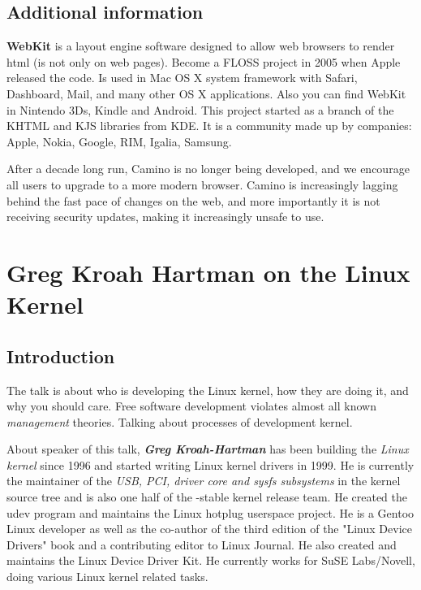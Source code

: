 \documentclass[11pt]{article}
\begin{document}
\subsection{Additional information}

\textbf{WebKit} is a layout engine software designed to allow web browsers to render html (is not only on web pages). Become a FLOSS project in 2005 when Apple released the code. Is used in Mac OS X system framework with Safari, Dashboard, Mail, and many other OS X applications. Also you can find WebKit in Nintendo 3Ds, Kindle and Android. This project started as a branch of the KHTML and KJS libraries from KDE. It is a community made up by companies: Apple, Nokia, Google, RIM, Igalia, Samsung.

After a decade long run, Camino is no longer being developed, and we encourage all users to upgrade to a more modern browser. Camino is increasingly lagging behind the fast pace of changes on the web, and more importantly it is not receiving security updates, making it increasingly unsafe to use.

\newpage


\section{Greg Kroah Hartman on the Linux Kernel}

\subsection{Introduction}
The talk is about who is developing the Linux kernel, how they are doing it, and why you should care. Free software development violates almost all known \emph{management} theories. Talking about processes of development kernel.

About speaker of this talk, \textbf{\emph{Greg Kroah-Hartman}} has been building the \emph{Linux kernel} since 1996 and started writing Linux kernel drivers in 1999. He is currently the maintainer of the \emph{USB, PCI, driver core and sysfs subsystems} in the kernel source tree and is also one half of the -stable kernel release team. He created the udev program and maintains the Linux hotplug userspace project. He is a Gentoo Linux developer as well as the co-author of the third edition of the "Linux Device Drivers" book and a contributing editor to Linux Journal. He also created and maintains the Linux Device Driver Kit. He currently works for SuSE Labs/Novell, doing various Linux kernel related tasks. 
\end{document}
